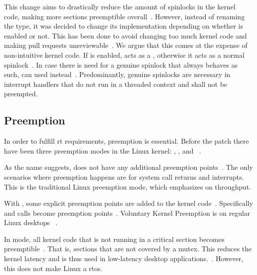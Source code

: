 \documentclass[10pt,twocolumn,a4paper]{article}
\begin{document}
\noindent This change aims to drastically reduce the amount of spinlocks in the kernel code, making more sections preemptible overall~\cite{lf:sleeping-spinlocks}.
However, instead of renaming the type, it was decided to change its implementation depending on whether  is enabled or not.
This has been done to avoid changing too much kernel code and making pull requests unreviewable~\cite{reghenzani_realtime_2019}.
We argue that this comes at the expense of non-intuitive kernel code.
If  is enabled,  acts as a , otherwise it acts as a normal spinlock~\cite{mckenney_realtime_2005}.
In case there is need for a genuine spinlock that always behaves as such,  can used instead~\cite{mckenney_realtime_2005, chyyuu_github_2017}.
Predominantly, genuine spinlocks are necessary in interrupt handlers that do not run in a threaded context and shall not be preempted.


\subsection{Preemption}\label{subsec:preemption}
In order to fulfill \acrshort{rt} requirements, preemption is essential.
Before the  patch there have been three preemption modes in the Linux kernel: , , and ~\cite{lf:preemption,kernel_preemption_modes}.

As the name suggests,  does not have any additional preemption points~\cite{kernel_preemption_modes}.
The only scenarios where preemption happens are for system call returns and interrupts.
This is the traditional Linux preemption mode, which emphasizes on throughput.

With , some explicit preemption points are added to the kernel code~\cite{kernel_preemption_modes}.
Specifically  and  calls become preemption points~\cite{day_re_2007}.
Voluntary Kernel Preemption is on regular Linux desktops ~\cite{mckenney_realtime_2005}.

In  mode, all kernel code that is not running in a critical section becomes preemptible~\cite{kernel_preemption_modes}.
That is, sections that are not covered by a mutex.
This reduces the kernel latency and is thus used in low-latency desktop applications.~\cite{mckenney_realtime_2005}.
However, this does not make Linux a \acrshort{rtos}.
\newline
\end{document}
